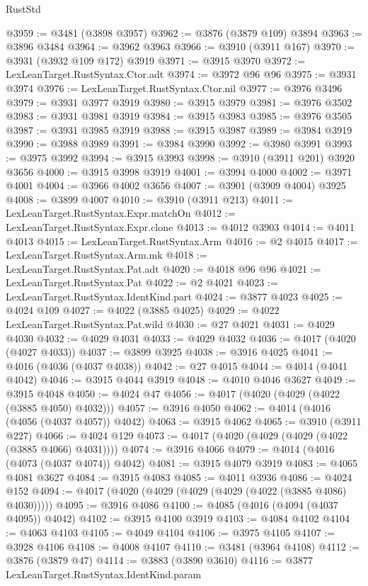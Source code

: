 \begin{lexlean}{RustStd}
\begin{coremodule}
@3959 := @3481 (@3898 @3957)
@3962 := @3876 (@3879 @109) @3894
@3963 := @3896 @3484
@3964 := @3962 @3963
@3966 := @3910 (@3911 @167)
@3970 := @3931 (@3932 @109 @172) @3919
@3971 := @3915 @3970
@3972 := LexLeanTarget.RustSyntax.Ctor.adt
@3974 := @3972 @96 @96
@3975 := @3931 @3974
@3976 := LexLeanTarget.RustSyntax.Ctor.nil
@3977 := @3976 @3496
@3979 := @3931 @3977 @3919
@3980 := @3915 @3979
@3981 := @3976 @3502
@3983 := @3931 @3981 @3919
@3984 := @3915 @3983
@3985 := @3976 @3505
@3987 := @3931 @3985 @3919
@3988 := @3915 @3987
@3989 := @3984 @3919
@3990 := @3988 @3989
@3991 := @3984 @3990
@3992 := @3980 @3991
@3993 := @3975 @3992
@3994 := @3915 @3993
@3998 := @3910 (@3911 @201) @3920 @3656
@4000 := @3915 @3998 @3919
@4001 := @3994 @4000
@4002 := @3971 @4001
@4004 := @3966 @4002 @3656
@4007 := @3901 (@3909 @4004) @3925
@4008 := @3899 @4007
@4010 := @3910 (@3911 @213)
@4011 := LexLeanTarget.RustSyntax.Expr.matchOn
@4012 := LexLeanTarget.RustSyntax.Expr.clone
@4013 := @4012 @3903
@4014 := @4011 @4013
@4015 := LexLeanTarget.RustSyntax.Arm
@4016 := @2 @4015
@4017 := LexLeanTarget.RustSyntax.Arm.mk
@4018 := LexLeanTarget.RustSyntax.Pat.adt
@4020 := @4018 @96 @96
@4021 := LexLeanTarget.RustSyntax.Pat
@4022 := @2 @4021
@4023 := LexLeanTarget.RustSyntax.IdentKind.part
@4024 := @3877 @4023
@4025 := @4024 @109
@4027 := @4022 (@3885 @4025)
@4029 := @4022 LexLeanTarget.RustSyntax.Pat.wild
@4030 := @27 @4021
@4031 := @4029 @4030
@4032 := @4029 @4031
@4033 := @4029 @4032
@4036 := @4017 (@4020 (@4027 @4033))
@4037 := @3899 @3925
@4038 := @3916 @4025
@4041 := @4016 (@4036 (@4037 @4038))
@4042 := @27 @4015
@4044 := @4014 (@4041 @4042)
@4046 := @3915 @4044 @3919
@4048 := @4010 @4046 @3627
@4049 := @3915 @4048
@4050 := @4024 @47
@4056 := @4017 (@4020 (@4029 (@4022 (@3885 @4050) @4032)))
@4057 := @3916 @4050
@4062 := @4014 (@4016 (@4056 (@4037 @4057)) @4042)
@4063 := @3915 @4062
@4065 := @3910 (@3911 @227)
@4066 := @4024 @129
@4073 := @4017 (@4020 (@4029 (@4029 (@4022 (@3885 @4066) @4031))))
@4074 := @3916 @4066
@4079 := @4014 (@4016 (@4073 (@4037 @4074)) @4042)
@4081 := @3915 @4079 @3919
@4083 := @4065 @4081 @3627
@4084 := @3915 @4083
@4085 := @4011 @3936
@4086 := @4024 @152
@4094 := @4017 (@4020 (@4029 (@4029 (@4029 (@4022 (@3885 @4086) @4030)))))
@4095 := @3916 @4086
@4100 := @4085 (@4016 (@4094 (@4037 @4095)) @4042)
@4102 := @3915 @4100 @3919
@4103 := @4084 @4102
@4104 := @4063 @4103
@4105 := @4049 @4104
@4106 := @3975 @4105
@4107 := @3928 @4106
@4108 := @4008 @4107
@4110 := @3481 (@3964 @4108)
@4112 := @3876 (@3879 @47)
@4114 := @3883 (@3890 @3610)
@4116 := @3877 LexLeanTarget.RustSyntax.IdentKind.param

\end{coremodule}
\end{lexlean}
